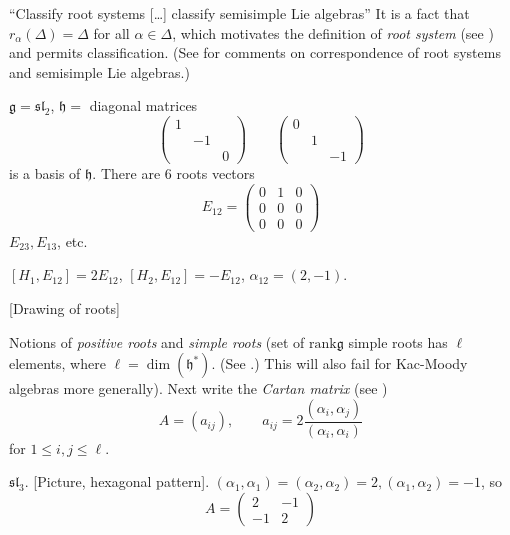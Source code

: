 ``Classify root systems […] classify semisimple Lie algebras'' 
It is a fact that $r_\alpha (\Delta)=\Delta$ for all $\alpha \in \Delta$, 
which motivates the definition of {\it root system} 
(see \cite[Definition 15.1]{KLAL}) 
and permits classification. (See \cite[Lecture 17]{KLAL} for comments on
correspondence of root systems and semisimple Lie algebras.)

\begin{example}
\label{example-root-system-sl2}
$\mathfrak{g}=\mathfrak{sl}_2$, $\mathfrak{h}=$ diagonal matrices
$$
\begin{pmatrix}
1&&\\ 
&-1&\\
& & 0
\end{pmatrix}
\qquad 
\begin{pmatrix}
0&&\\ 
&1&\\
& & -1
\end{pmatrix}
$$
is a basis of $\mathfrak{h}$. There are 6 roots vectors
$$
E_{12}=
\begin{pmatrix}
0 & 1 & 0\\
0 & 0 & 0\\
0 & 0 & 0
\end{pmatrix}
$$
$E_{23},E_{13}$, etc.
\end{example}

\begin{exercise}
\label{exercise-basis-of-h}
$[H_1,E_{12}]=2E_{12}$, $[H_2,E_{12}]=-E_{12}$, $\alpha_{12}=(2,-1)$.
\end{exercise}

[Drawing of roots]

Notions of {\it positive roots} and {\it simple roots} 
(set of $\text{rank}\mathfrak{g}$ simple roots has $\ell$ elements,
 where $\ell=\dim(\mathfrak{h}^*)$.  (See \cite[Definition 17.1]{KLAL}.)
This will also fail for Kac-Moody algebras more generally). 
Next write the {\it Cartan matrix} (see \cite[Definition 17.2]{KLAL})
$$
A=(a_{ij}),\qquad  a_{ij}=2\frac{(\alpha_i,\alpha_j)}{(\alpha_i,\alpha_i)}
$$
for $1\leq i,j \leq \ell$.

\begin{example}
\label{example-Cartan-matrix-sl3}
$\mathfrak{sl}_3$. [Picture, hexagonal pattern]. 
$(\alpha_1,\alpha_1)=(\alpha_2,\alpha_2)=2,(\alpha_1,\alpha_2)=-1$, so
$$
A=\begin{pmatrix}
2&-1\\ 
-1&2
\end{pmatrix}
$$
\end{example}

